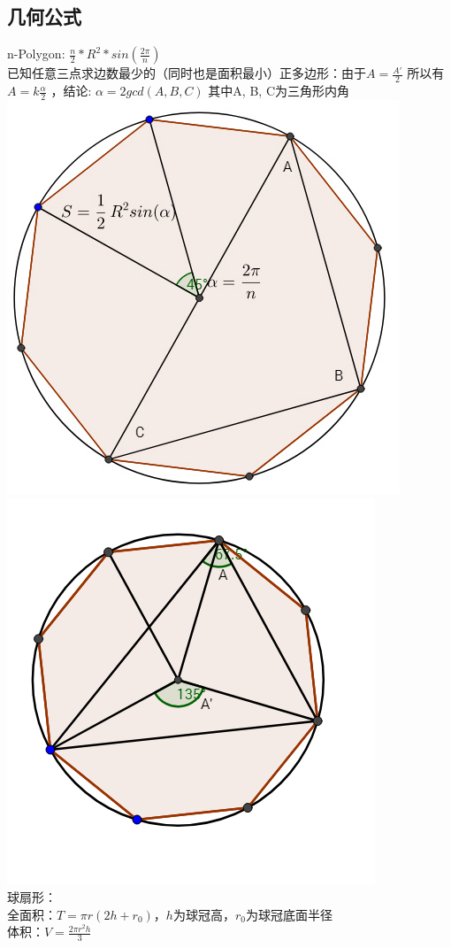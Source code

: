 	\subsection{几何公式}
	n-Polygon: $\frac{n}{2} * R ^ 2 * sin( \frac{2 \pi }{n} )$\\
	已知任意三点求边数最少的（同时也是面积最小）正多边形：由于$A=\frac{A'}{2}$ 所以有$A=k \frac{\alpha}{2}$ ，结论: $\alpha = 2gcd(A,B,C)$ 其中A, B, C为三角形内角\\
	\includegraphics[scale=0.5]{./codes/geometry/npolygon.jpg} \includegraphics[scale=0.6]{./codes/geometry/npolygon_2.png}\\
	球扇形：\\
	全面积：$T = \pi r(2h+r_0)$，$h$为球冠高，$r_0$为球冠底面半径\\
	体积：$V = \frac{2\pi r^{2}h}{3}$\\
	
